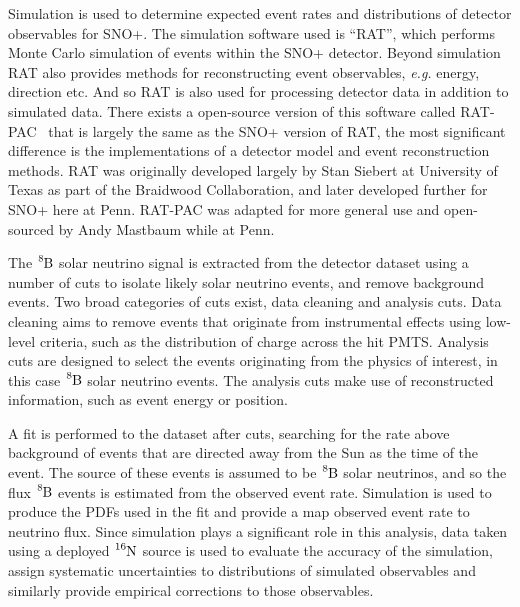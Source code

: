 Simulation is used to determine expected event rates and distributions of
detector observables for SNO+.
The simulation software used is ``RAT'', which performs Monte Carlo
simulation of events within the SNO+ detector.
Beyond simulation RAT also provides methods for reconstructing event
observables, \textit{e.g.} energy, direction etc.
And so RAT is also used for processing detector data in addition
to simulated data.
There exists a open-source version of this software called
RAT-PAC~\cite{ratpac} that is largely the same as the SNO+ version of RAT,
the most significant difference is the implementations of a detector model
and event reconstruction methods.
RAT was originally developed largely by Stan Siebert at University of Texas as part of
the Braidwood Collaboration, and later developed further for SNO+ here at Penn.
RAT-PAC was adapted for more general use and open-sourced by Andy Mastbaum while at Penn.

The $\ce{^{8}B}$ solar neutrino signal is extracted from the detector dataset
using a number of cuts to isolate likely solar neutrino events, and remove
background events.
Two broad categories of cuts exist, data cleaning and analysis cuts.
Data cleaning aims to remove events that originate from instrumental effects using
low-level criteria, such as the distribution of charge across the hit PMTS\@.
Analysis cuts are designed to select the events originating from the physics of
interest, in this case $\ce{^{8}B}$ solar neutrino events.
The analysis cuts make use of reconstructed information, such as event energy
or position.

A fit is performed to the dataset after cuts, searching for the rate above background of events
that are directed away from the Sun as the time of the event.
The source of these events is assumed to be $\ce{^{8}B}$ solar neutrinos, and
so the flux $\ce{^{8}B}$ events is estimated from the observed event rate.
Simulation is used to produce the PDFs used in the fit and provide a map observed
event rate to neutrino flux.
Since simulation plays a significant role in this analysis, data taken using
a deployed $\ce{^{16}N}$ source is used to evaluate the accuracy of the
simulation, assign systematic uncertainties to distributions of simulated observables
and similarly provide empirical corrections to those observables.








